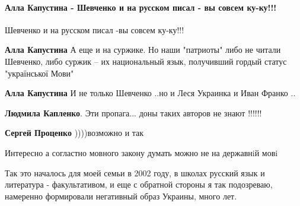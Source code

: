  
 
 
 
 
\paragraph{Алла Капустина - Шевченко и на русском писал - вы совсем ку-ку!!!}
\label{sec:18_06_2020.fb.zharkih_ekaterina.1.mova_jazyk.cmt.kapustina_shevchenko_jazyk}

\begin{itemize}
Шевченко и на русском писал -вы совсем ку-ку!!!


\begin{itemize}
\textbf{Алла Капустина}
А еще и на суржике. Но наши "патриоты" либо не читали Шевченко, либо суржик -- их национальный язык, получивший гордый статус "української Мови"

\textbf{Алла Капустина} И не только Шевченко ..но и Леся Украинка и Иван Франко ..

\textbf{Людмила Капленко}. Эти пропага... доны таких авторов не знают !!!!!!🤔🤔🤔🤔

\textbf{Сергей Проценко} ))))возможно и так
\end{itemize}

Интересно а согластно мовного закону думать можно не на державнiй мовi



Так это началось для моей семьи в 2002 году, в школах русский язык и литература
- факультативом, и еще с обратной стороны я так подозреваю, намеренно
формировали негативный образ Украины, много лет.




\end{itemize}
